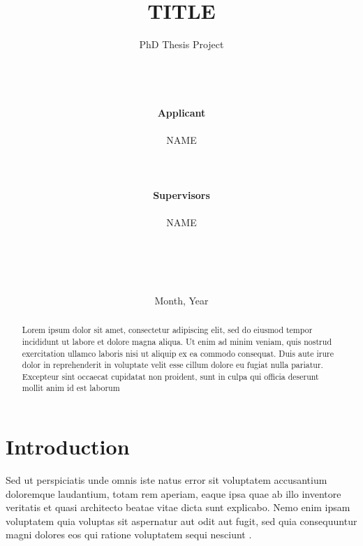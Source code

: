 \documentclass[12pt]{extarticle}
\begin{document}
\begin{titlepage}
\title{\textbf{TITLE}}%

\author{\Large{PhD Thesis Project}
\\
\\
\\
\\
\\
\LARGE{\textbf{Applicant}}
\\
\\
\large{NAME} %
\\
\\
\\
\\
\LARGE{\textbf{Supervisors}}
\\
\\
\large{NAME} %
\\
\\
\\
\\
\\
}
\date{\hfill Month, Year}

\clearpage\maketitle
\thispagestyle{empty}

\end{titlepage}

\begin{abstract}
Lorem ipsum dolor sit amet, consectetur adipiscing elit, sed do eiusmod tempor incididunt ut labore et dolore magna aliqua. Ut enim ad minim veniam, quis nostrud exercitation ullamco laboris nisi ut aliquip ex ea commodo consequat. Duis aute irure dolor in reprehenderit in voluptate velit esse cillum dolore eu fugiat nulla pariatur. Excepteur sint occaecat cupidatat non proident, sunt in culpa qui officia deserunt mollit anim id est laborum
\end{abstract}

\section{Introduction}
Sed ut perspiciatis unde omnis iste natus error sit voluptatem accusantium doloremque laudantium, totam rem aperiam, eaque ipsa quae ab illo inventore veritatis et quasi architecto beatae vitae dicta sunt explicabo. Nemo enim ipsam voluptatem quia voluptas sit aspernatur aut odit aut fugit, sed quia consequuntur magni dolores eos qui ratione voluptatem sequi nesciunt
\cite{telles2019standard,dhillon2016fundamentals}. %
\end{document}
